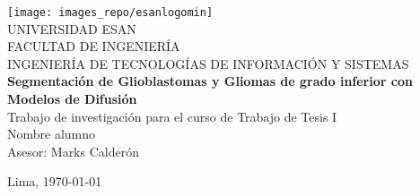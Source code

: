 \documentclass[12pt,times]{report}
\numberwithin{equation}{chapter} %
\begin{document}
\begin{titlepage}

	\begin{center}
	    \texttt{[image: images\_repo/esanlogomin]}
		\vspace*{2cm} \\
		UNIVERSIDAD ESAN \vspace*{1ex} \\
		FACULTAD DE INGENIERÍA \vspace*{1ex} \\
		INGENIERÍA DE TECNOLOGÍAS DE INFORMACIÓN Y SISTEMAS\vspace*{8ex} \\
		\textbf{Segmentación de Glioblastomas y Gliomas de grado inferior con Modelos de Difusión}
		\vspace*{8ex}\\	
		Trabajo de investigación para el curso de Trabajo de Tesis I 
		\vspace*{8ex} \\	
		Nombre alumno \\
		Asesor: Marks Calderón		
		\vfill
		
		Lima, \today 
		
	\end{center}
\end{titlepage}
\renewcommand{\listfigurename}{Índice de Figuras}
\renewcommand{\tablename}{Tabla}
\renewcommand{\listtablename}{Índice de Tablas}






\tableofcontents            %


\setcounter{secnumdepth}{3} %
\setcounter{tocdepth}{3}    %




\listoffigures	%

\listoftables  %









\appendix
\renewcommand{\appendixname}{Anexos}
\renewcommand{\appendixtocname}{Anexos}
\renewcommand{\appendixpagename}{Anexos}
\clearpage
\addappheadtotoc
\appendixpage


\printbibliography[heading=bibintoc,title={BIBLIOGRAFÍA}]
\end{document}

